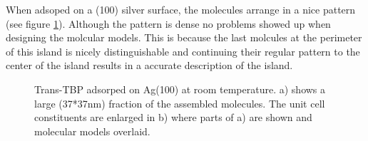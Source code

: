 When adsoped on a (100) silver surface, the molecules arrange in a nice pattern (see figure \ref{fig:two-leg-trans-ag100-motiv}). Although the pattern is dense no problems showed up when designing the molcular models. This is because the last molcules at the perimeter of this island is nicely distinguishable and continuing their regular pattern to the center of the island results in a accurate description of the island.

\begin{figure}[h]
 \centering
\caption{Trans-TBP adsorped on Ag(100) at room temperature. a) shows a large (37*37nm) fraction of the assembled molecules. The unit cell constituents are enlarged in b) where parts of a) are shown and molecular models overlaid.}
\label{fig:two-leg-trans-ag100-motiv}
\end{figure}